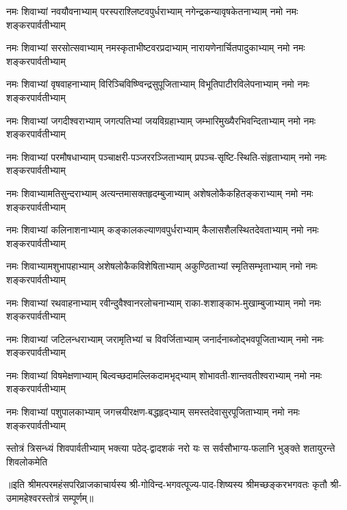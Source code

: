 
\begin{AutoCols}[\maxColumns]
\fourlineindentedshloka
{नमः शिवाभ्यां नवयौवनाभ्याम्‌}
{परस्पराश्लिष्टवपुर्धराभ्याम्‌}
{नगेन्द्रकन्यावृषकेतनाभ्याम्‌}
{नमो नमः शङ्करपार्वतीभ्याम्‌}%

\fourlineindentedshloka
{नमः शिवाभ्यां सरसोत्सवाभ्याम्‌}
{नमस्कृताभीष्टवरप्रदाभ्याम्‌}
{नारायणेनार्चितपादुकाभ्याम्}
{नमो नमः शङ्करपार्वतीभ्याम्‌}%

\fourlineindentedshloka
{नमः शिवाभ्यां वृषवाहनाभ्याम्‌}
{विरिञ्चिविष्ण्विन्द्रसुपूजिताभ्याम्‌}
{विभूतिपाटीरविलेपनाभ्याम्‌}
{नमो नमः शङ्करपार्वतीभ्याम्‌}%

\fourlineindentedshloka
{नमः शिवाभ्यां जगदीश्वराभ्याम्}
{जगत्पतिभ्यां जयविग्रहाभ्याम्‌}
{जम्भारिमुख्यैरभिवन्दिताभ्याम्‌}
{नमो नमः शङ्करपार्वतीभ्याम्‌}%

\fourlineindentedshloka
{नमः शिवाभ्यां परमौषधाभ्याम्‌}
{पञ्चाक्षरी-पञ्जररञ्जिताभ्याम्‌}
{प्रपञ्च-सृष्टि-स्थिति-संहृताभ्याम्‌}
{नमो नमः शङ्करपार्वतीभ्याम्‌}%

\fourlineindentedshloka
{नमः शिवाभ्यामतिसुन्दराभ्याम्‌}
{अत्यन्तमासक्तहृदम्बुजाभ्याम्‌}
{अशेषलोकैकहितङ्कराभ्याम्‌}
{नमो नमः शङ्करपार्वतीभ्याम्‌}%

\fourlineindentedshloka
{नमः शिवाभ्यां कलिनाशनाभ्याम्‌}
{कङ्कालकल्याणवपुर्धराभ्याम्‌}
{कैलासशैलस्थितदेवताभ्याम्‌}
{नमो नमः शङ्करपार्वतीभ्याम्‌}%

\fourlineindentedshloka
{नमः शिवाभ्यामशुभापहाभ्याम्‌}
{अशेषलोकैकविशेषिताभ्याम्‌}
{अकुण्ठिताभ्यां स्मृतिसम्भृताभ्याम्‌}
{नमो नमः शङ्करपार्वतीभ्याम्‌}%

\fourlineindentedshloka
{नमः शिवाभ्यां रथवाहनाभ्याम्‌}
{रवीन्दुवैश्वानरलोचनाभ्याम्‌}
{राका-शशाङ्काभ-मुखाम्बुजाभ्याम्‌}
{नमो नमः शङ्करपार्वतीभ्याम्‌}%

\fourlineindentedshloka
{नमः शिवाभ्यां जटिलन्धराभ्याम्‌}
{जरामृतिभ्यां च विवर्जिताभ्याम्‌}
{जनार्दनाब्जोद्भवपूजिताभ्याम्‌}
{नमो नमः शङ्करपार्वतीभ्याम्‌}%

\fourlineindentedshloka
{नमः शिवाभ्यां विषमेक्षणाभ्याम्‌}
{बिल्वच्छदामल्लिकदामभृद्‌भ्याम्‌}
{शोभावती-शान्तवतीश्वराभ्याम्‌}
{नमो नमः शङ्करपार्वतीभ्याम्‌}%

\fourlineindentedshloka
{नमः शिवाभ्यां पशुपालकाभ्याम्‌}
{जगत्त्रयीरक्षण-बद्धहृद्‌भ्याम्‌}
{समस्तदेवासुरपूजिताभ्याम्‌}
{नमो नमः शङ्करपार्वतीभ्याम्‌}%

\fourlineindentedshloka
{स्तोत्रं त्रिसन्ध्यं शिवपार्वतीभ्याम्‌}
{भक्त्या पठेद्-द्वादशकं नरो यः}
{स सर्वसौभाग्य-फलानि भुङ्क्ते}
{शतायुरन्ते शिवलोकमेति}%

{॥इति श्रीमत्परमहंसपरिव्राजकाचार्यस्य श्री-गोविन्द-भगवत्पूज्य-पाद-शिष्यस्य
श्रीमच्छङ्करभगवतः कृतौ श्री-उमामहेश्वरस्तोत्रं सम्पूर्णम्‌॥}

\end{AutoCols}